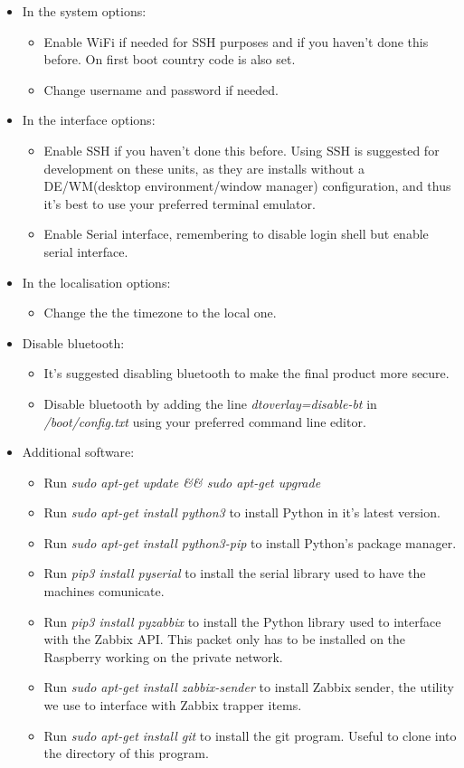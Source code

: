 \documentclass[a4paper,11pt]{scrartcl}
\begin{document}
\begin{itemize}   
    \item In the system options:
    \begin{itemize}
        \item Enable WiFi if needed for SSH purposes and if you haven't done this before. On first boot country code is also set.
        \item Change username and password if needed.
    \end{itemize}
    \item In the interface options:
    \begin{itemize}
        \item Enable SSH if you haven't done this before. Using SSH is suggested for development on these units, as they are installs without a DE/WM(desktop environment/window manager) configuration, and thus it's best to use your preferred terminal emulator.
        \item Enable Serial interface, remembering to disable login shell but enable serial interface.
    \end{itemize}
    \item In the localisation options:
        \begin{itemize}
            \item Change the the timezone to the local one.
        \end{itemize}
    \item Disable bluetooth:
    \begin{itemize}
        \item It's suggested disabling bluetooth to make the final product more secure.
        \item Disable bluetooth by adding the line \textit{dtoverlay=disable-bt} in \textit{/boot/config.txt} using your preferred command line editor.
    \end{itemize}
    \item Additional software:
    \begin{itemize}
        \item Run \textit{sudo apt-get update \&\& sudo apt-get upgrade}
        \item Run \textit{sudo apt-get install python3} to install Python in it's latest version.
        \item Run \textit{sudo apt-get install python3-pip} to install Python's package manager.
        \item Run \textit{pip3 install pyserial} to install the serial library used to have the machines comunicate.
        \item Run \textit{pip3 install pyzabbix} to install the Python library used to interface with the Zabbix API. This packet only has to be installed on the Raspberry working on the private network.
        \item Run \textit{sudo apt-get install zabbix-sender} to install Zabbix sender, the utility we use to interface with Zabbix trapper items.
        \item Run \textit{sudo apt-get install git} to install the git program. Useful to clone into the directory of this program.
    \end{itemize}
\end{itemize}
\end{document}
